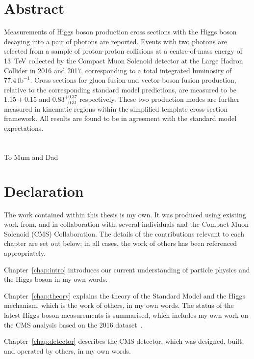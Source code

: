 \chapter*{\centering Abstract}
Measurements of Higgs boson production cross sections 
with the Higgs boson decaying into a pair of photons are reported.
Events with two photons are selected from a sample of proton-proton collisions 
at a centre-of-mass energy of \SI{13}{TeV} 
collected by the Compact Muon Solenoid detector at the Large Hadron Collider in 2016 and 2017,
corresponding to a total integrated luminosity of $77.4~\mathrm{fb}^{-1}$.
Cross sections for gluon fusion and vector boson fusion production, 
relative to the corresponding standard model predictions,
are measured to be $1.15 \pm 0.15$ and $0.83_{-0.31}^{+0.37}$ respectively.
These two production modes are further measured in kinematic regions 
within the simplified template cross section framework.
All results are found to be in agreement with the standard model expectations.


\chapter*{\centering }%
\begin{center}
    \thispagestyle{empty}
    To Mum and Dad
\end{center}


\chapter*{\centering Declaration}
The work contained within this thesis is my own. 
It was produced using existing work from, and in collaboration with, 
several individuals and the Compact Muon Solenoid (CMS) Collaboration. 
The details of the contributions relevant to each chapter are set out below;
in all cases, the work of others has been referenced appropriately.

Chapter~\ref{chap:intro} introduces our current understanding of particle physics 
and the Higgs boson in my own words.

Chapter~\ref{chap:theory} explains the theory of the Standard Model and the Higgs mechanism, 
which is the work of others, in my own words. 
The status of the latest Higgs boson measurements is summarised, 
which includes my own work on the CMS \Hgg analysis based on the 2016 dataset~\cite{HIG-16-040}.

Chapter~\ref{chap:detector} describes the CMS detector, 
which was designed, built, and operated by others, in my own words.

